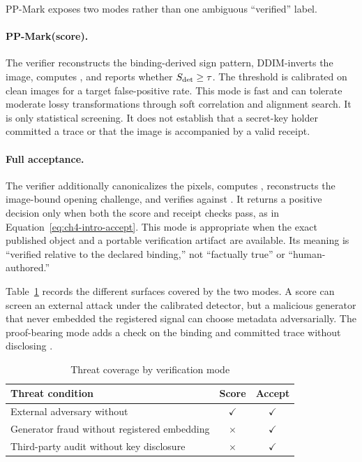 PP-Mark exposes two modes rather than one ambiguous ``verified'' label.

\paragraph{PP-Mark(score).}
The verifier reconstructs the binding-derived sign pattern, DDIM-inverts the
image, computes \PPDetectionScore{}, and reports whether
\(S_{\mathrm{det}}\geq\tau\).  The threshold is calibrated on clean
images for a target false-positive rate.  This mode is fast and can tolerate
moderate lossy transformations through soft correlation and alignment search.  It
is only statistical screening.  It does not establish that a secret-key holder
committed a trace or that the image is accompanied by a valid receipt.

\paragraph{Full acceptance.}
The verifier additionally canonicalizes the pixels, computes \PPImageHash{},
reconstructs the image-bound opening challenge, and verifies \PPReceipt{} against
\PPPublicStatement{}.  It returns a positive decision only when both the score and
receipt checks pass, as in Equation~\eqref{eq:ch4-intro-accept}.  This mode is
appropriate when the exact published object and a portable verification artifact
are available.  Its meaning is ``verified relative to the declared binding,'' not
``factually true'' or ``human-authored.''

Table~\ref{tab:ch4-threat-coverage} records the different surfaces covered by the
two modes.  A score can screen an external attack under the calibrated detector,
but a malicious generator that never embedded the registered signal can choose
metadata adversarially.  The proof-bearing mode adds a check on the binding and
committed trace without disclosing \PPSecretKey{}.

\begin{table}[H]
    \centering
    \caption{Threat coverage by verification mode}
    \label{tab:ch4-threat-coverage}
    \small
    \setlength{\tabcolsep}{7pt}
    \renewcommand{\arraystretch}{1.15}
    \begin{tabular}{@{}p{}cc@{}}
        \toprule
        Threat condition & Score & Accept \\
        \midrule
        External adversary without \PPSecretKey{} & \(\checkmark\) & \(\checkmark\) \\
        Generator fraud without registered embedding & \(\times\) & \(\checkmark\) \\
        Third-party audit without key disclosure & \(\times\) & \(\checkmark\) \\
        \bottomrule
    \end{tabular}
\end{table}

